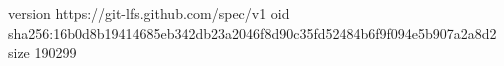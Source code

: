 version https://git-lfs.github.com/spec/v1
oid sha256:16b0d8b19414685eb342db23a2046f8d90c35fd52484b6f9f094e5b907a2a8d2
size 190299
